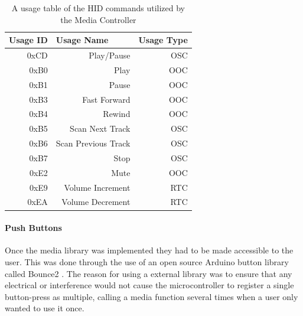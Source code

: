 \documentclass{article}
\begin{document}
			\begin{table}[h]
				\centering
				\caption{A usage table of the HID commands utilized by the Media Controller}
				\label{usageTable}
				\begin{tabular}{|r|r|r|}
					\hline
					\multicolumn{1}{|l|}{Usage ID} & \multicolumn{1}{l|}{Usage Name} & \multicolumn{1}{l|}{Usage Type} \\ \hline
					0xCD                           & Play/Pause                      & OSC                             \\
					0xB0                           & Play                            & OOC                             \\
					0xB1                           & Pause                           & OOC                             \\
					0xB3                           & Fast Forward                    & OOC                             \\
					0xB4                           & Rewind                          & OOC                             \\
					0xB5                           & Scan Next Track                 & OSC                             \\
					0xB6                           & Scan Previous Track             & OSC                             \\
					0xB7                           & Stop                            & OSC                             \\
					0xE2                           & Mute                            & OOC                             \\
					0xE9                           & Volume Increment                & RTC                             \\
					0xEA                           & Volume Decrement                & RTC                             \\ \hline
				\end{tabular}
			\end{table}
			
			\paragraph{Push Buttons}
			Once the media library was implemented they had to be made accessible to the user. This was done through the use of an open source Arduino button library called Bounce2 \cite{Bounce2Git:online}. The reason for using a external library was to ensure that any electrical or interference would not cause the microcontroller to register a single button-press as multiple, calling a media function several times when a user only wanted to use it once.
			
\end{document}
